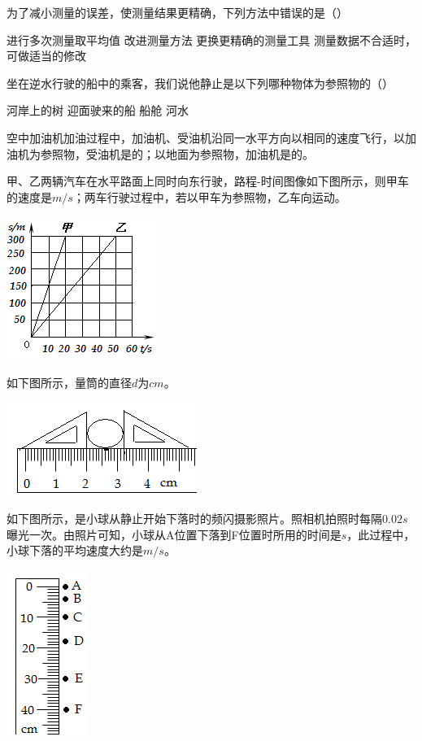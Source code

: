 \documentclass[12pt,twoside]{exam}
\begin{document}
\begin{Aquestions}
\begin{questions}
\question
为了减小测量的误差，使测量结果更精确，下列方法中错误的是（）
\begin{choices}
\choice 进行多次测量取平均值
\choice 改进测量方法
\choice 更换更精确的测量工具
\choice 测量数据不合适时，可做适当的修改
\end{choices}


\question
坐在逆水行驶的船中的乘客，我们说他静止是以下列哪种物体为参照物的（\answerline*[C]）

\begin{oneparchoices}
\choice 河岸上的树
\choice 迎面驶来的船
\choice 船舱 
\choice 河水
\end{oneparchoices}


\question
空中加油机加油过程中，加油机、受油机沿同一水平方向以相同的速度飞行，以加油机为参照物，受油机是\answerline*[静止]的；以地面为参照物，加油机是\answerline*[运动]的。


\question
甲、乙两辆汽车在水平路面上同时向东行驶，路程-时间图像如下图所示，则甲车的速度是\answerline*[15]$m/s$；两车行驶过程中，若以甲车为参照物，乙车向\answerline*[西]运动。

\includegraphics[scale=1]{figures/图片11.png} 


\question
如下图所示，量筒的直径$d$为\answerline*[1.20]$cm$。

\includegraphics[scale=1]{figures/图片12.png} 


\question
如下图所示，是小球从静止开始下落时的频闪摄影照片。照相机拍照时每隔$0.02s$曝光一次。由照片可知，小球从A位置下落到F位置时所用的时间是\answerline*[0.1]$s$，此过程中，小球下落的平均速度大约是\answerline*[4]$m/s$。

\includegraphics[scale=1]{figures/图片13.png} 



\end{questions}
\end{Aquestions}
\end{document}
